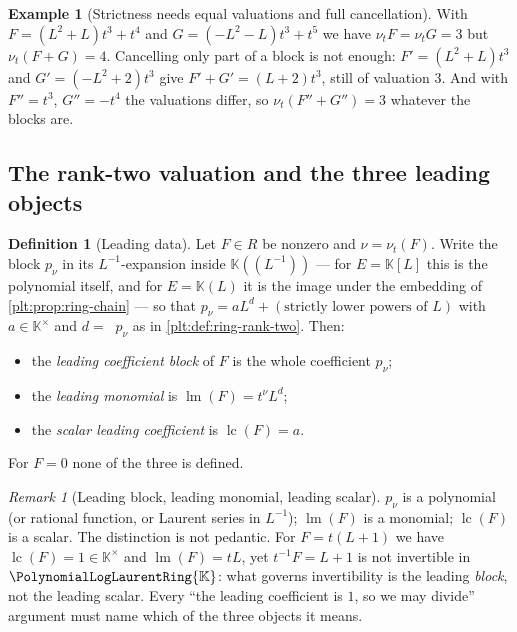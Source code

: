 \documentclass[11pt,oneside]{article}
\theoremstyle{plain}
\theoremstyle{definition}
\newtheorem{definition}[theorem]{Definition}
\newtheorem{example}[theorem]{Example}
\theoremstyle{remark}
\newtheorem{remark}[theorem]{Remark}
\newcommand{\K}{\mathbb{K}}
\newcommand{\PLlau}{\PolynomialLogLaurentRing{\K}}       %
\newcommand{\ordt}{\nu_{t}}                              %
\DeclareMathOperator{\lm}{lm}
\DeclareMathOperator{\lc}{lc}
\DeclareMathOperator{\degL}{deg_{L}}
\begin{document}
\begin{example}[Strictness needs equal valuations and full cancellation]
\label{plt:ex:lead-strictness}
With \(F=(L^2+L)t^3+t^4\) and \(G=(-L^2-L)t^3+t^5\) we have
\(\ordt F=\ordt G=3\) but \(\ordt(F+G)=4\).  Cancelling only part of a block
is not enough: \(F'=(L^2+L)t^3\) and \(G'=(-L^2+2)t^3\) give
\(F'+G'=(L+2)t^3\), still of valuation \(3\).  And with \(F''=t^3\),
\(G''=-t^4\) the valuations differ, so \(\ordt(F''+G'')=3\) whatever the
blocks are.
\end{example}

\subsection{The rank-two valuation and the three leading objects}
\label{plt:sec:lead-rank-two}

\begin{definition}[Leading data]
\label{plt:def:lead-leading-data}
Let \(F\in R\) be nonzero and \(\nu=\ordt(F)\).  Write the block \(p_\nu\) in
its \(L^{-1}\)-expansion inside \(\K((L^{-1}))\) --- for \(E=\K[L]\) this is
the polynomial itself, and for \(E=\K(L)\) it is the image under the embedding
of \cref{plt:prop:ring-chain} --- so that
\(p_{\nu}=aL^{d}+(\text{strictly lower powers of }L)\) with \(a\in\K^\times\)
and \(d=\degL p_\nu\) as in \cref{plt:def:ring-rank-two}.  Then:
\begin{itemize}
\item the \emph{leading coefficient block} of \(F\) is the whole coefficient
  \(p_\nu\);
\item the \emph{leading monomial} is \(\lm(F)=t^{\nu}L^{d}\);
\item the \emph{scalar leading coefficient} is \(\lc(F)=a\).
\end{itemize}
For \(F=0\) none of the three is defined.
\end{definition}

\begin{remark}[Leading block, leading monomial, leading scalar]
\label{plt:rmk:lead-three-objects}
\(p_\nu\) is a polynomial (or rational function, or Laurent series in
\(L^{-1}\)); \(\lm(F)\) is a monomial; \(\lc(F)\) is a scalar.  The
distinction is not pedantic.  For \(F=t(L+1)\) we have \(\lc(F)=1\in\K^\times\)
and \(\lm(F)=tL\), yet \(t^{-1}F=L+1\) is not invertible in \(\PLlau\): what
governs invertibility is the leading \emph{block}, not the leading scalar.
Every ``the leading coefficient is \(1\), so we may divide'' argument must
name which of the three objects it means.
\end{remark}
\end{document}
